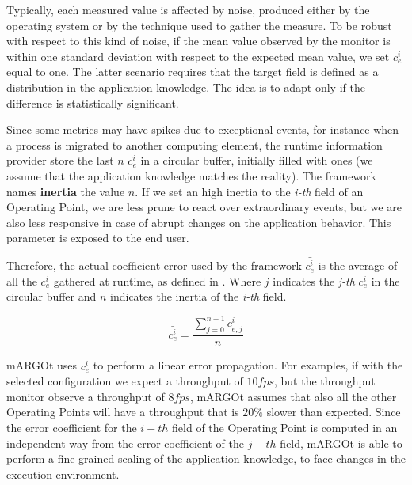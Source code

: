 Typically, each measured value is affected by noise, produced either by the operating system or by the technique used to gather the measure.
To be robust with respect to this kind of noise, if the mean value observed by the monitor is within one standard deviation with respect to the expected mean value, we set $c_{e}^{i}$ equal to one.
The latter scenario requires that the target field is defined as a distribution in the application knowledge.
The idea is to adapt only if the difference is statistically significant.

Since some metrics may have spikes due to exceptional events, for instance when a process is migrated to another computing element, the runtime information provider store the last $n$ $c_{e}^{i}$ in a circular buffer, initially filled with ones (we assume that the application knowledge matches the reality).
The framework names \textbf{inertia} the value $n$.
If we set an high inertia to the \textit{i-th} field of an Operating Point, we are less prune to react over extraordinary events, but we are also less responsive in case of abrupt changes on the application behavior.
This parameter is exposed to the end user.


Therefore, the actual coefficient error used by the framework $\bar{c_{e}^{i}}$ is the average of all the $c_{e}^{i}$ gathered at runtime, as defined in .
Where $j$ indicates the \textit{j-th} $c_{e}^{i}$ in the circular buffer and $n$ indicates the inertia of the \textit{i-th} field.


\begin{equation}
\label{eq:coefficient_error_real}
\bar{c_{e}^{i}}=\dfrac{\sum_{j=0}^{n-1} c_{e,j}^{i}}{n}
\end{equation}


mARGOt uses $\bar{c_{e}^{i}}$ to perform a linear error propagation.
For examples, if with the selected configuration we expect a throughput of $10fps$, but the throughput monitor observe a throughput of $8fps$, mARGOt assumes that also all the other Operating Points will have a throughput that is $20\%$ slower than expected.
Since the error coefficient for the $i-th$ field of the Operating Point is computed in an independent way from the error coefficient of the $j-th$ field, mARGOt is able to perform a fine grained scaling of the application knowledge, to face changes in the execution environment.


